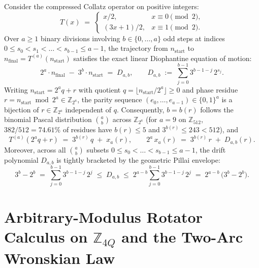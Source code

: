 \documentclass[11pt,a4paper]{article}
\theoremstyle{definition}
\theoremstyle{remark}
\begin{document}
Consider the compressed Collatz operator on positive integers:
\begin{equation}
  \label{eq:collatz-step}
  T(x) \;=\;
  \begin{cases}
    x / 2, & x \equiv 0 \pmod 2, \\
    (3x + 1) / 2, & x \equiv 1 \pmod 2.
  \end{cases}
\end{equation}
Over $a \ge 1$ binary divisions involving $b \in \{0,\dots,a\}$ odd steps at indices $0 \le s_0 < s_1 < \dots < s_{b-1} \le a - 1$, the trajectory from $n_{\mathrm{start}}$ to $n_{\mathrm{final}} = T^{(a)}(n_{\mathrm{start}})$ satisfies the exact linear Diophantine equation of motion:
\begin{equation}
  \label{eq:collatz-equation-of-motion}
  2^a \cdot n_{\mathrm{final}} \;-\; 3^b \cdot n_{\mathrm{start}} \;=\; D_{a,b}, \qquad
  D_{a,b} \;:=\; \sum_{j=0}^{b-1} 3^{b-1-j}\,2^{s_j}.
\end{equation}
Writing $n_{\mathrm{start}} = 2^a q + r$ with quotient $q = \lfloor n_{\mathrm{start}}/2^a\rfloor \ge 0$ and phase residue $r = n_{\mathrm{start}}\bmod 2^a \in \mathbb{Z}_{2^a}$, the parity sequence $(e_0,\dots,e_{a-1})\in\{0,1\}^a$ is a bijection of $r\in\mathbb{Z}_{2^a}$ independent of $q$. Consequently, $b = b(r)$ follows the binomial Pascal distribution $\binom{a}{b}$ across $\mathbb{Z}_{2^a}$ (for $a=9$ on $\mathbb{Z}_{512}$, $382/512 = 74.61\%$ of residues have $b(r)\le 5$ and $3^{b(r)}\le 243 < 512$), and
\begin{equation}
  \label{eq:block-affine-transition}
  T^{(a)}(2^a q + r) \;=\; 3^{b(r)}\,q \;+\; x_a(r), \qquad
  2^a\,x_a(r) \;=\; 3^{b(r)}\,r \;+\; D_{a,b}(r).
\end{equation}
Moreover, across all $\binom{a}{b}$ subsets $0 \le s_0 < \dots < s_{b-1} \le a-1$, the drift polynomial $D_{a,b}$ is tightly bracketed by the geometric Pillai envelope:
\begin{equation}
  \label{eq:drift-envelope}
  3^b - 2^b \;=\; \sum_{j=0}^{b-1} 3^{b-1-j}\,2^j \;\le\; D_{a,b} \;\le\; 2^{a-b}\sum_{j=0}^{b-1} 3^{b-1-j}\,2^j \;=\; 2^{a-b}\,\bigl(3^b - 2^b\bigr).
\end{equation}

\section{Arbitrary-Modulus Rotator Calculus on $\mathbb{Z}_{4Q}$ and the Two-Arc Wronskian Law}
\label{sec:two-arc-wronskian}
\end{document}
